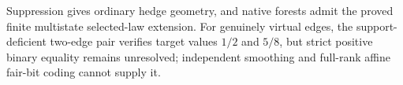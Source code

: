 Suppression gives ordinary hedge geometry, and native forests admit the proved finite multistate selected-law extension. For genuinely virtual edges, the support-deficient two-edge pair verifies target values \(1/2\) and \(5/8\), but strict positive binary equality remains unresolved; independent smoothing and full-rank affine fair-bit coding cannot supply it.
